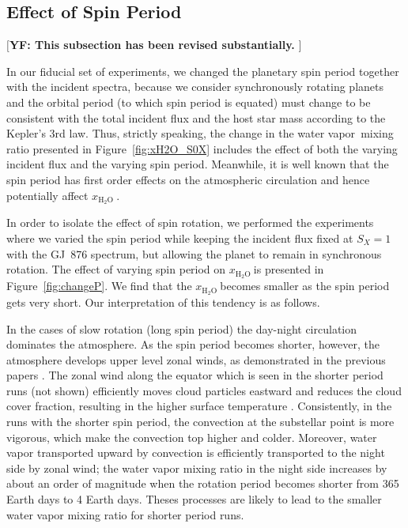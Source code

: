\documentclass[11pt,numberedappendix,twocolappendix,]{emulateapj}
\def\water{H$_2$O }
\def\xwater{$x_\text{\water}$}
\def\memo#1{\color{red}$[${\bf #1}$]$ \color{black}}
\newcommand{\wv}{{\color{orange}water vapor\ }}
\begin{document}
\subsection{Effect of Spin Period}
\label{ss:sensitivity_Porbit}

\memo{YF: This subsection has been revised substantially. }

In our fiducial set of experiments, we changed the planetary spin period together with the incident spectra, because we consider synchronously rotating planets and the orbital period (to which spin period is equated) must change to be consistent with the total incident flux and the host star mass according to the Kepler's 3rd law. 
Thus, strictly speaking, the change in the \wv mixing ratio presented in Figure~\ref{fig:xH2O_S0X} includes the effect of both the varying incident flux and the varying spin period. 
Meanwhile, it is well known that the spin period has first order effects on the atmospheric circulation and hence potentially affect \xwater. 

In order to isolate the effect of spin rotation, we performed the experiments where we varied the spin period while keeping the incident flux fixed at $S_X=1$ with the GJ~876 spectrum, but allowing the planet to remain in synchronous rotation. 
The effect of varying spin period on \xwater is presented in Figure~\ref{fig:changeP}. 
We find that the \xwater becomes smaller as the spin period gets very short.  %
Our interpretation of this tendency is as follows. 

In the cases of slow rotation (long spin period) the day-night circulation dominates the atmosphere. 
As the spin period becomes shorter, however, the atmosphere develops upper level zonal winds, as demonstrated in the previous papers \citep{Merlis2010, Edson2011, Kopparapu2016}. 
%
The zonal wind along the equator which is seen in the shorter period runs (not shown) efficiently moves cloud particles eastward and reduces the cloud cover fraction, resulting in the higher surface temperature \citep{Kopparapu2016}.  
Consistently, in the runs with the shorter spin period, the convection at the substellar point is more vigorous, which make the convection top higher and colder. 
Moreover, water vapor transported upward by convection is efficiently transported to the night side by zonal wind; the water vapor mixing ratio in the night side increases by about an order of magnitude when the rotation period becomes shorter from 365 Earth days to 4 Earth days. 
Theses processes are likely to lead to the smaller water vapor mixing ratio for shorter period runs. 
\end{document}
